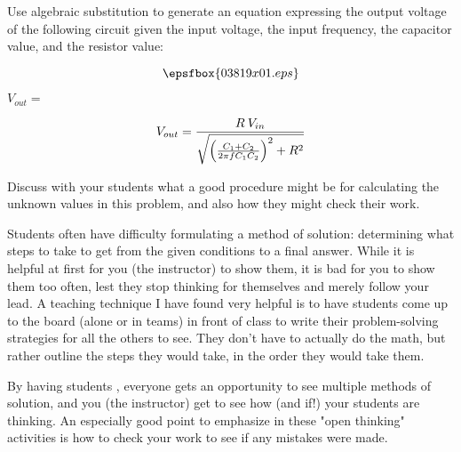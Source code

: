 

Use algebraic substitution to generate an equation expressing the output voltage of the following circuit given the input voltage, the input frequency, the capacitor value, and the resistor value:

$$\epsfbox{03819x01.eps}$$

\vskip 10pt

$V_{out} = $







$$V_{out} = {{R \> V_{in}} \over \sqrt{\left({{C_1 + C_2} \over 2 \pi f C_1 C_2}\right)^2 + R^2}}$$







Discuss with your students what a good procedure might be for calculating the unknown values in this problem, and also how they might check their work.

\vskip 10pt

Students often have difficulty formulating a method of solution: determining what steps to take to get from the given conditions to a final answer.  While it is helpful at first for you (the instructor) to show them, it is bad for you to show them too often, lest they stop thinking for themselves and merely follow your lead.  A teaching technique I have found very helpful is to have students come up to the board (alone or in teams) in front of class to write their problem-solving strategies for all the others to see.  They don't have to actually do the math, but rather outline the steps they would take, in the order they would take them.

By having students , everyone gets an opportunity to see multiple methods of solution, and you (the instructor) get to see how (and if!) your students are thinking.  An especially good point to emphasize in these "open thinking" activities is how to check your work to see if any mistakes were made.




